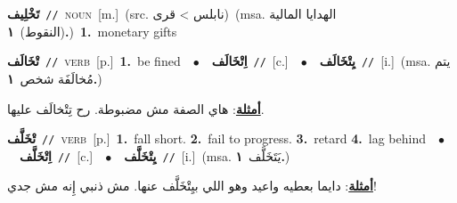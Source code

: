 \documentclass[10pt,a4paper,twoside]{article} %
\begin{document}
\begin{multicols}{2}
{\setlength\topsep{0pt}\textbf{\foreignlanguage{arabic}{تَخْلِيف}}\ {\color{gray}\texttt{//}\color{black}}\ \textsc{noun}\ [m.]\ (src. \color{gray}\foreignlanguage{arabic}{نابلس > قرى}\color{black})\ \color{gray}(msa. \foreignlanguage{arabic}{الهدايا المالية (النقوط)}~\foreignlanguage{arabic}{\textbf{١.}})\color{black}\ \textbf{1.}~monetary gifts\ } \vspace{2mm}

{\setlength\topsep{0pt}\textbf{\foreignlanguage{arabic}{تْخَالَف}}\ {\color{gray}\texttt{//}\color{black}}\ \textsc{verb}\ [p.]\ \textbf{1.}~be fined\ \ $\bullet$\ \ \setlength\topsep{0pt}\textbf{\foreignlanguage{arabic}{اِتْخَالَف}}\ {\color{gray}\texttt{//}\color{black}}\ [c.]\ \ $\bullet$\ \ \setlength\topsep{0pt}\textbf{\foreignlanguage{arabic}{يِتْخَالَف}}\ {\color{gray}\texttt{//}\color{black}}\ [i.]\ \color{gray}(msa. \foreignlanguage{arabic}{يتم مُخالَفَة شخص}~\foreignlanguage{arabic}{\textbf{١.}})\color{black}\  \begin{flushright}\color{gray}\foreignlanguage{arabic}{\textbf{\underline{\foreignlanguage{arabic}{أمثلة}}}: هاي الصفة مش مضبوطة. رح تِتْخالَف عليها.}\end{flushright}\color{black}} \vspace{2mm}

{\setlength\topsep{0pt}\textbf{\foreignlanguage{arabic}{تْخَلَّف}}\ {\color{gray}\texttt{//}\color{black}}\ \textsc{verb}\ [p.]\ \textbf{1.}~fall short.  \textbf{2.}~fail to progress.  \textbf{3.}~retard  \textbf{4.}~lag behind\ \ $\bullet$\ \ \setlength\topsep{0pt}\textbf{\foreignlanguage{arabic}{اِتْخَلَّف}}\ {\color{gray}\texttt{//}\color{black}}\ [c.]\ \ $\bullet$\ \ \setlength\topsep{0pt}\textbf{\foreignlanguage{arabic}{يِتْخَلَّف}}\ {\color{gray}\texttt{//}\color{black}}\ [i.]\ \color{gray}(msa. \foreignlanguage{arabic}{يَتَخَلَّف}~\foreignlanguage{arabic}{\textbf{١.}})\color{black}\  \begin{flushright}\color{gray}\foreignlanguage{arabic}{\textbf{\underline{\foreignlanguage{arabic}{أمثلة}}}: دايما بعطيه واعيد وهو اللي بيِتْخَلَّف عنها. مش ذنبي إِنه مش جدي!}\end{flushright}\color{black}} \vspace{2mm}


\end{multicols}
\end{document}
